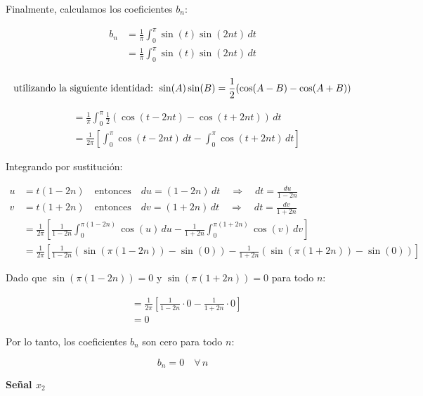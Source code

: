 \documentclass[12pt,a4paper]{report}
\begin{document}
\begin{enumerate}[label=\alph*),left=0pt]
\begin{itemize}[left=0pt]
  Finalmente, calculamos los coeficientes \(b_n\):
  
  $$
  \begin{aligned}
    b_n &= \frac{1}{\pi} \int_0^\pi \sin(t) \sin(2nt) \, dt \\
        &= \frac{1}{\pi} \int_0^\pi \sin(t) \sin(2nt) \, dt \\
  \end{aligned}
  $$

  $$
  \text{utilizando la siguiente identidad: }
  \sin(A)\sin(B) = \frac{1}{2} (\cos(A - B) - \cos(A + B)) \\
  $$

  $$
  \begin{aligned}
    &= \frac{1}{\pi} \int_0^\pi \frac{1}{2} (\cos(t - 2nt) - \cos(t + 2nt)) \, dt \\
    &= \frac{1}{2\pi} \left[ \int_0^\pi \cos(t - 2nt) \, dt - \int_0^\pi \cos(t + 2nt) \, dt \right]
  \end{aligned}
  $$
  
  Integrando por sustitución:
  
  $$
  \begin{aligned}
    u &= t(1 - 2n) \quad \text{entonces} \quad du = (1 - 2n) \, dt \quad \Longrightarrow \quad dt = \frac{du}{1 - 2n} \\
    v &= t(1 + 2n) \quad \text{entonces} \quad dv = (1 + 2n) \, dt \quad \Longrightarrow \quad dt = \frac{dv}{1 + 2n} \\
    &= \frac{1}{2\pi} \left[ \frac{1}{1 - 2n} \int_0^{\pi(1 - 2n)} \cos(u) \, du - \frac{1}{1 + 2n} \int_0^{\pi(1 + 2n)} \cos(v) \, dv \right] \\
    &= \frac{1}{2\pi} \left[ \frac{1}{1 - 2n} (\sin(\pi (1 - 2n)) - \sin(0)) - \frac{1}{1 + 2n} (\sin(\pi (1 + 2n)) - \sin(0)) \right]
  \end{aligned}
  $$
  
  Dado que \(\sin(\pi (1 - 2n)) = 0\) y \(\sin(\pi (1 + 2n)) = 0\) para todo \(n\):
  
  $$
  \begin{aligned}
    &= \frac{1}{2\pi} \left[ \frac{1}{1 - 2n} \cdot 0 - \frac{1}{1 + 2n} \cdot 0 \right] \\
    &= 0
  \end{aligned}
  $$
  
  Por lo tanto, los coeficientes \(b_n\) son cero para todo \(n\):
  
  $$
  b_n = 0 \quad \forall \, n
  $$
  

	\textbf{Señal $x_2$}\\


\end{itemize}
\end{enumerate}
\end{document}
